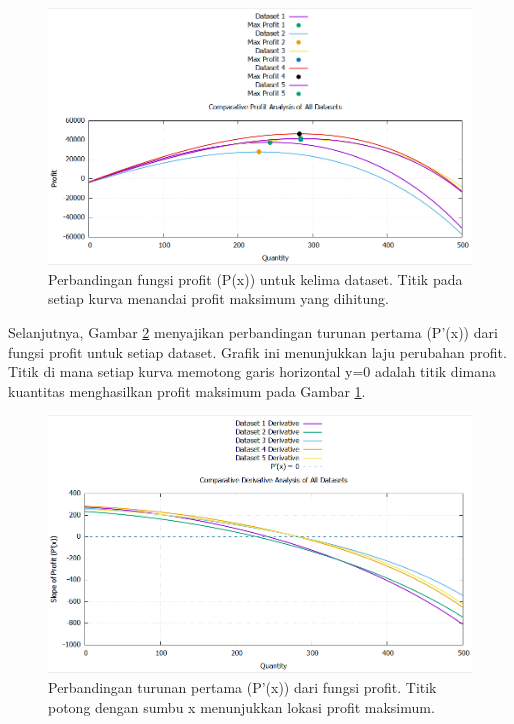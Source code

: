 \documentclass[conference]{IEEEtran}
\begin{document}
\begin{figure}[htbp]
\centering
\includegraphics[width=\columnwidth]{plot_all_profits.png}
\caption{Perbandingan fungsi profit (P(x)) untuk kelima dataset. Titik pada setiap kurva menandai profit maksimum yang dihitung.}
\label{fig:profits}
\end{figure}

Selanjutnya, Gambar \ref{fig:derivatives} menyajikan perbandingan turunan pertama (P'(x)) dari fungsi profit untuk setiap dataset. Grafik ini menunjukkan laju perubahan profit. Titik di mana setiap kurva memotong garis horizontal y=0 adalah titik dimana kuantitas menghasilkan profit maksimum pada Gambar \ref{fig:profits}.

\begin{figure}[htbp]
\centering
\includegraphics[width=\columnwidth]{plot_all_derivatives.png}
\caption{Perbandingan turunan pertama (P'(x)) dari fungsi profit. Titik potong dengan sumbu x menunjukkan lokasi profit maksimum.}
\label{fig:derivatives}
\end{figure}
\end{document}
